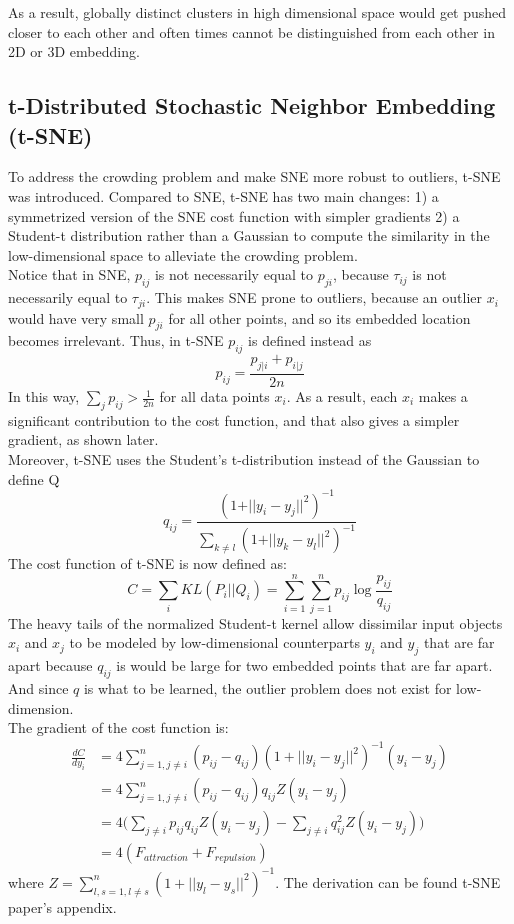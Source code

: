 As a result, globally distinct clusters in high dimensional space
would get pushed closer to each other and often times cannot be
distinguished from each other in 2D or 3D embedding. 

\subsection{t-Distributed Stochastic Neighbor Embedding (t-SNE)}
To address the crowding problem and make SNE more robust to outliers, t-SNE was introduced. Compared to SNE, t-SNE has two main changes: 1) a symmetrized version of the SNE cost function with simpler
gradients 2) a Student-t distribution rather than a Gaussian to
compute the similarity in the low-dimensional space to alleviate the
crowding problem.\\

\noindent Notice that in SNE, $p_{ij}$ is not necessarily equal to
$p_{ji}$, because $\tau_{ij}$ is not necessarily equal to
$\tau_{ji}$. This makes SNE prone to outliers, because an outlier
$x_i$ would have very small $p_{ji}$ for all other points, and so its
embedded location becomes irrelevant. Thus, in t-SNE $p_{ij}$ is
defined instead as 
\[
p_{ij} = \frac{p_{j \vert i}+p_{i \vert j}}{2n}
\]
In this way, $\sum_j p_{ij} > \frac{1}{2n}$ for all data points
$x_i$. As a result, each $x_i$ makes a significant contribution to the
cost function, and that also gives a simpler gradient, as shown
later. \\ 

\noindent Moreover, t-SNE uses the Student's t-distribution instead of
the Gaussian to define Q 
\[
q_{ij}=\frac{(1+\vert \vert y_i - y_j \vert \vert^2)^{-1}}{\sum_{k\neq l}(1+\vert \vert y_k - y_l \vert \vert^2)^{-1}}
\]
The cost function of t-SNE is now defined as:
\[
C=\sum_i KL(P_i \vert \vert Q_i) = \sum_{i=1}^n \sum_{j=1}^n p_{ij} \log \frac{p_{ij}}{q_{ij}}
\]
The heavy tails of the normalized Student-t kernel allow dissimilar
input objects $x_i$ and $x_j$ to be modeled by low-dimensional
counterparts $y_i$ and $y_j$ that are far apart because $q_{ij}$ is
would be large for two embedded points that are far apart. 
And since $q$ is what to be learned, the outlier problem does not
exist for low-dimension. \\ 

\noindent The gradient of the cost function is:
\begin{align*}
\frac{dC}{dy_i}
&=4\sum_{j=1, j\neq i}^{n} (p_{ij}-q_{ij})(1+||y_i-y_j||^2)^{-1}(y_i-y_j)\\
&= 4\sum_{j=1, j\neq i}^{n} (p_{ij}-q_{ij})q_{ij}Z(y_i-y_j)\\
&= 4\Big ( \sum_{j \neq i} p_{ij}q_{ij}Z(y_i-y_j)-\sum_{j\neq i}q_{ij}^2 Z(y_i-y_j) \Big )\\
&= 4(F_{attraction}+F_{repulsion})
\end{align*}
where $Z=\sum_{l,s=1, l\neq s}^{n} (1+||y_l-y_s||^2)^{-1}$. The
derivation can be found t-SNE paper's appendix.\\ 

